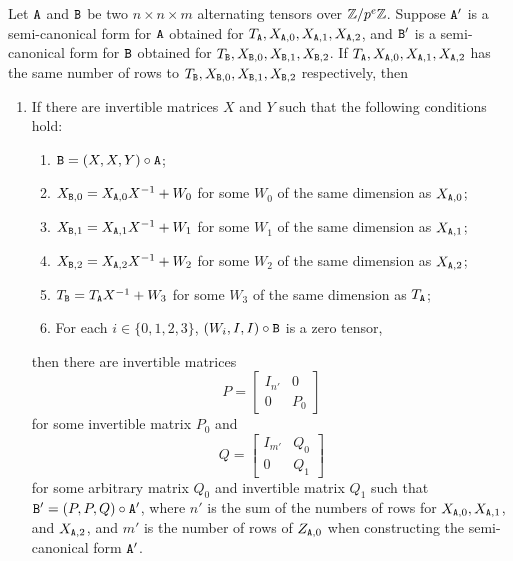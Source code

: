 \begin{definition}
\begin{enumerate}
\end{enumerate}
\end{definition}

\begin{lemma}\label{lem:tensor_isomorphism_restricted}
Let $\mathtt{A}$ and $\mathtt{B}$ be two $n \times n \times m$ alternating tensors over $\mathbb{Z} / p^e \mathbb{Z}$. 
Suppose $\mathtt{A}'$ is a semi-canonical form for $\mathtt{A}$ obtained for $T_{\mathtt{A}}, X_{\mathtt{A}, 0}, X_{\mathtt{A}, 1}, X_{\mathtt{A}, 2}$,
 and $\mathtt{B}'$ is a semi-canonical form for $\mathtt{B}$ obtained for $T_{\mathtt{B}}, X_{\mathtt{B}, 0}, X_{\mathtt{B}, 1}, X_{\mathtt{B}, 2}$.
If $T_{\mathtt{A}}, X_{\mathtt{A}, 0}, X_{\mathtt{A}, 1}, X_{\mathtt{A}, 2}$ has the same number of rows to $T_{\mathtt{B}}, X_{\mathtt{B}, 0}, X_{\mathtt{B}, 1}, X_{\mathtt{B}, 2}$ respectively, then 
\begin{enumerate}
\item If there are invertible matrices $X$ and $Y$ such that 
the following conditions hold:
\begin{enumerate}
\item  $\mathtt{B} = (X, X, Y) \circ \mathtt{A}$;
\item $X_{\mathtt{B}, 0} = X_{\mathtt{A}, 0} X^{-1} + W_{0}$ for some $W_0$ of the same dimension as $X_{\mathtt{A}, 0}$;
\item $X_{\mathtt{B}, 1} = X_{\mathtt{A}, 1} X^{-1} + W_{1}$ for some $W_1$ of the same dimension as $X_{\mathtt{A}, 1}$; 
\item $X_{\mathtt{B}, 2} = X_{\mathtt{A}, 2} X^{-1} + W_{2}$ for some $W_2$ of the same dimension as $X_{\mathtt{A}, 2}$; 
\item $T_{\mathtt{B}} = T_{\mathtt{A}} X^{-1} + W_{3}$ for some $W_3$ of the same dimension as $T_{\mathtt{A}}$;
\item  For each $i \in \{0, 1, 2, 3\}$,  $(W_i, I, I) \circ \mathtt{B}$ is a zero tensor,
\end{enumerate}
then there are invertible matrices
\[P = \begin{bmatrix} I_{n'} & 0 \\ 0 & P_0\end{bmatrix}\]
for some invertible matrix $P_0$
and 
\[Q = \begin{bmatrix} I_{m'} & Q_0 \\ 0 & Q_1\end{bmatrix}\]
for some arbitrary matrix $Q_0$ and invertible matrix $Q_1$
such that $\mathtt{B}' = (P, P, Q)\circ \mathtt{A}'$, 
where $n'$ is the sum of the numbers of rows for $X_{\mathtt{A}, 0}, X_{\mathtt{A}, 1}$, and $X_{\mathtt{A}, 2}$,
and $m'$ is the number of rows of $Z_{\mathtt{A}, 0}$ when constructing the semi-canonical form $\mathtt{A}'$. 




\end{enumerate}
\end{lemma}
